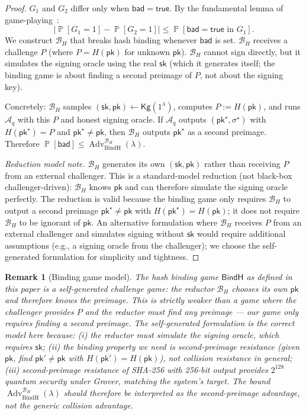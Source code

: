 \documentclass[11pt]{article}
\newtheorem{remark}{Remark}
\newcommand{\Prob}{\operatorname{\mathbb{P}}}
\newcommand{\Adv}{\operatorname{Adv}}
\newcommand{\Aq}{\mathcal{A}_q}
\begin{document}
\begin{proof}
$G_1$ and $G_2$ differ only when $\mathsf{bad}=\mathsf{true}$.
By the fundamental lemma of game-playing~\cite{bellare2006security}:
\[
|\Prob[G_1=1]-\Prob[G_2=1]| \le \Prob[\mathsf{bad}=\mathsf{true}\text{ in }G_1].
\]
We construct $\mathcal{B}_H$ that breaks hash binding whenever $\mathsf{bad}$ is set.
$\mathcal{B}_H$ receives a challenge $P$ (where $P=H(\mathsf{pk})$ for unknown $\mathsf{pk}$).
$\mathcal{B}_H$ cannot sign directly, but it simulates the signing oracle using the real $\mathsf{sk}$ (which it generates itself; the binding game is about finding a second preimage of $P$, not about the signing key).

Concretely: $\mathcal{B}_H$ samples $(\mathsf{sk},\mathsf{pk})\gets\mathsf{Kg}(1^\lambda)$, computes $P:=H(\mathsf{pk})$, and runs $\Aq$ with this $P$ and honest signing oracle.
If $\Aq$ outputs $(\mathsf{pk}^\star,\sigma^\star)$ with $H(\mathsf{pk}^\star)=P$ and $\mathsf{pk}^\star\neq\mathsf{pk}$, then $\mathcal{B}_H$ outputs $\mathsf{pk}^\star$ as a second preimage.
Therefore $\Prob[\mathsf{bad}] \le \Adv_{\mathrm{BindH}}^{\mathcal{B}_H}(\lambda)$.

\emph{Reduction model note.}
$\mathcal{B}_H$ generates its own $(\mathsf{sk},\mathsf{pk})$ rather than receiving $P$ from an external challenger.
This is a standard-model reduction (not black-box challenger-driven): $\mathcal{B}_H$ knows $\mathsf{pk}$ and can therefore simulate the signing oracle perfectly.
The reduction is valid because the binding game only requires $\mathcal{B}_H$ to output a second preimage $\mathsf{pk}^\star\neq\mathsf{pk}$ with $H(\mathsf{pk}^\star)=H(\mathsf{pk})$; it does not require $\mathcal{B}_H$ to be ignorant of $\mathsf{pk}$.
An alternative formulation where $\mathcal{B}_H$ receives $P$ from an external challenger and simulates signing without $\mathsf{sk}$ would require additional assumptions (e.g., a signing oracle from the challenger); we choose the self-generated formulation for simplicity and tightness.
\end{proof}

\begin{remark}[Binding game model]\label{rem:binding-model}
The hash binding game $\mathsf{BindH}$ as defined in this paper is a \emph{self-generated challenge} game: the reductor $\mathcal{B}_H$ chooses its own $\mathsf{pk}$ and therefore knows the preimage.
This is strictly weaker than a game where the challenger provides $P$ and the reductor must find any preimage --- our game only requires finding a \emph{second} preimage.
The self-generated formulation is the correct model here because:
(i) the reductor must simulate the signing oracle, which requires $\mathsf{sk}$;
(ii) the binding property we need is second-preimage resistance (given $\mathsf{pk}$, find $\mathsf{pk}'\neq\mathsf{pk}$ with $H(\mathsf{pk}')=H(\mathsf{pk})$), not collision resistance in general;
(iii) second-preimage resistance of SHA-256 with 256-bit output provides $2^{128}$ quantum security under Grover, matching the system's target.
The bound $\Adv_{\mathrm{BindH}}^{\mathcal{B}_H}(\lambda)$ should therefore be interpreted as the second-preimage advantage, not the generic collision advantage.
\end{remark}
\end{document}
